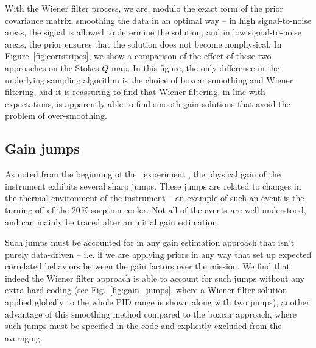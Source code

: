 \documentclass[twocolumn]{aa}
\begin{document}
%

With the Wiener filter process, we are, modulo the exact form of the prior covariance matrix, smoothing the data in an optimal way -- in high signal-to-noise areas, the signal is allowed to determine the solution, and in low signal-to-noise areas, the prior ensures that the solution does not become nonphysical. In Figure~\ref{fig:corrstripes}, we show a comparison of the effect of these two approaches on the Stokes $Q$ map. In this figure, the only difference in the underlying sampling algorithm is the choice of boxcar smoothing and Wiener filtering, and it is reassuring to find that Wiener filtering, in line with expectations, is apparently able to find smooth gain solutions that avoid the problem of over-smoothing.

\subsection{Gain jumps}
\label{sec:gainjumps}
As noted from the beginning of the \Planck\ experiment \citep[see, e.g.,][]{planck2013-p05}, the physical gain of the instrument exhibits several sharp jumps. These jumps are related to changes in the thermal environment of the instrument -- an example of such an event is the turning off of the 20\,K sorption cooler. Not all of the events are well understood, and can mainly be traced after an initial gain estimation. %

Such jumps must be accounted for in any gain estimation approach that isn't purely data-driven -- i.e. if we are applying priors in any way that set up expected correlated behaviors between the gain factors over the mission. We find that indeed the Wiener filter approach is able to account for such jumps without any extra hard-coding (see Fig.~\ref{fig:gain_jumps}, where a Wiener filter solution applied globally to the whole PID range is shown along with two jumps), another advantage of this smoothing method compared to the boxcar approach, where such jumps must be specified in the code and explicitly excluded from the averaging.
\end{document}
